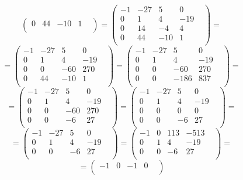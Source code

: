 \documentclass[a4paper,12pt]{article}
\begin{document}
\begin{itemize}
\begin{enumerate}
\[\begin{pmatrix}
0 & 44 & -10 & 1 & \\
\end{pmatrix}
=
\begin{pmatrix}
-1 & -27 & 5 & 0 & \\
0 & 1 & 4 & -19 & \\
0 & 14 & -4 & 4 & \\
0 & 44 & -10 & 1 & \\
\end{pmatrix}
=
\]
\[
=
\begin{pmatrix}
-1 & -27 & 5 & 0 & \\
0 & 1 & 4 & -19 & \\
0 & 0 & -60 & 270 & \\
0 & 44 & -10 & 1 & \\
\end{pmatrix}
=
\begin{pmatrix}
-1 & -27 & 5 & 0 & \\
0 & 1 & 4 & -19 & \\
0 & 0 & -60 & 270 & \\
0 & 0 & -186 & 837 & \\
\end{pmatrix}
=
\]
\[
=
\begin{pmatrix}
-1 & -27 & 5 & 0 & \\
0 & 1 & 4 & -19 & \\
0 & 0 & -60 & 270 & \\
0 & 0 & -6 & 27 & \\
\end{pmatrix}
=
\begin{pmatrix}
-1 & -27 & 5 & 0 & \\
0 & 1 & 4 & -19 & \\
0 & 0 & 0 & 0 & \\
0 & 0 & -6 & 27 & \\
\end{pmatrix}
=
\]
\[
=
\begin{pmatrix}
-1 & -27 & 5 & 0 & \\
0 & 1 & 4 & -19 & \\
0 & 0 & -6 & 27 & \\
\end{pmatrix}
=
\begin{pmatrix}
-1 & 0 & 113 & -513 & \\
0 & 1 & 4 & -19 & \\
0 & 0 & -6 & 27 & \\
\end{pmatrix}
=
\]
\[
=
\begin{pmatrix}
-1 & 0 & -1 & 0 & \\

\end{pmatrix}\]
\end{enumerate}
\end{itemize}
\end{document}
